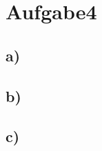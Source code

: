 \newpage
\section{Aufgabe4}
\label{sec:a4}

\subsection{a)}
\label{subsec:a4a}

\subsection{b)}
\label{subsec:a4b}

\subsection{c)}
\label{subsec:a4c}
